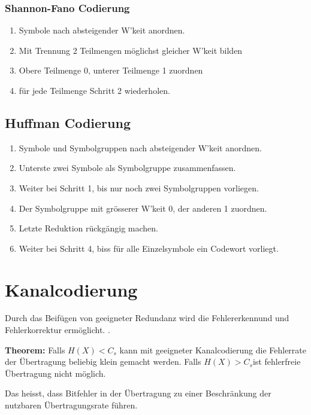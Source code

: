\documentclass[a4paper]{article}
\begin{document}
\begin{twocolumn}
\renewcommand{\arraystretch}{1}

\subsubsection{Shannon-Fano Codierung}
\begin{enumerate}
  \item Symbole nach absteigender W'keit anordnen.
  \item Mit Trennung 2 Teilmengen möglichst gleicher W'keit bilden
  \item Obere Teilmenge 0, unterer Teilmenge 1 zuordnen
  \item für jede Teilmenge Schritt 2 wiederholen.
\end{enumerate}

\subsection{Huffman Codierung}
\begin{enumerate}
  \item Symbole und Symbolgruppen nach absteigender W'keit anordnen.
  \item Unterste zwei Symbole als Symbolgruppe zusammenfassen.
  \item Weiter bei Schritt 1, bis nur noch zwei Symbolgruppen vorliegen.
  \item Der Symbolgruppe mit grösserer W'keit 0, der anderen 1 zuordnen.
  \item Letzte Reduktion rückgängig machen.
  \item Weiter bei Schritt 4, biss für alle Einzelsymbole ein Codewort vorliegt.
\end{enumerate}

\renewcommand{\arraystretch}{1.5}

\section{Kanalcodierung}
Durch das Beifügen von geeigneter Redundanz wird die Fehlererkennund und Fehlerkorrektur
ermöglicht. .

\textbf{Theorem:} Falls $H(X) < C_s$ kann mit geeigneter Kanalcodierung die Fehlerrate der 
Übertragung beliebig klein gemacht werden. Falls $H(X) > C_s$ist fehlerfreie Übertragung
nicht möglich.

Das heisst, dass Bitfehler in der Übertragung zu einer Beschränkung der nutzbaren 
Übertragungsrate führen.


\end{twocolumn}
\end{document}
